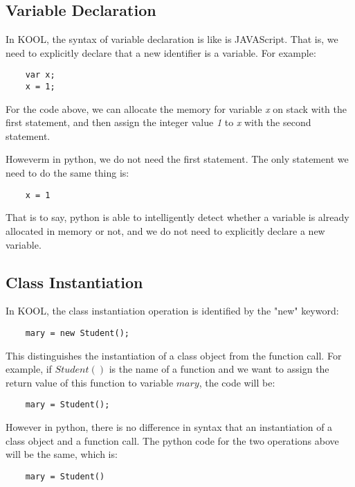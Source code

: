 \documentclass[a4paper]{article}
\begin{document}
\subsection{Variable Declaration}

In KOOL, the syntax of variable declaration is like is JAVAScript. That is, we need to explicitly declare that a new identifier is a variable. For example:

\begin{lstlisting}
    var x;
    x = 1;
\end{lstlisting}

For the code above, we can allocate the memory for variable \emph{x} on stack with the first statement, and then assign the integer value \emph{1} to \emph{x} with the second statement.

Howeverm in python, we do not need the first statement. The only statement we need to do the same thing is:

\begin{lstlisting}
    x = 1
\end{lstlisting}

That is to say, python is able to intelligently detect whether a variable is already allocated in memory or not, and we do not need to explicitly declare a new variable.

\subsection{Class Instantiation}

In KOOL, the class instantiation operation is identified by the "new" keyword:

\begin{lstlisting}
    mary = new Student();
\end{lstlisting}

This distinguishes the instantiation of a class object from the function call. For example, if $Student()$ is the name of a function and we want to assign the return value of this function to variable $mary$, the code will be:

\begin{lstlisting}
    mary = Student();
\end{lstlisting}

However in python, there is no difference in syntax that an instantiation of a class object and a function call. The python code for the two operations above will be the same, which is:

\begin{lstlisting}
    mary = Student()
\end{lstlisting}
\end{document}
